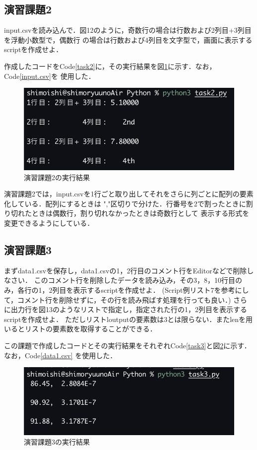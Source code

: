 \documentclass[a4paper,11pt]{jsarticle}
\begin{document}
\subsection{演習課題2}
  \begin{screen}
  input.csvを読み込んで．図12のように，奇数行の場合は行数および2列目+3列目を浮動小数型で，偶数行
  の場合は行数および4列目を文字型で，画面に表示するscriptを作成せよ．
  \end{screen}
  作成したコードをCode\ref{task2}に，その実行結果を図\ref{task2ans}に示す．なお，Code\ref{input.csv}を
  使用した．
  
  \begin{figure}[H]
    \centering
    \includegraphics[width=0.8\linewidth]{Experiment_photo/task2.png}
    \caption{演習課題2の実行結果}
    \label{task2ans}
  \end{figure}
  演習課題2では，input.csvを1行ごと取り出してそれをさらに列ごとに配列の要素化している．配列にするときは
  ","区切りで分けた．行番号を2で割ったときに割り切れたときは偶数行，割り切れなかったときは奇数行として
  表示する形式を変更できるようにしている．

\subsection{演習課題3}
  \begin{screen}
    まずdata1.csvを保存し，data1.csvの1，2行目のコメント行をEditorなどで削除しなさい．
    このコメント行を削除したデータを読み込み，その3，8，10行目のみ，各行の1，2列目を表示するscriptを作成せよ．
    (Script例リスト7を参考にして，コメント行を削除せずに，その行を読み飛ばす処理を行っても良い．)
    さらに出力行を図13のようなリストで指定し，指定された行の1，2列目を表示するscriptを作成せよ．
    ただしリストloutputの要素数は3とは限らない．またlenを用いるとリストの要素数を取得することができる．
  \end{screen}
  この課題で作成したコードとその実行結果をそれぞれCode\ref{task3}と図\ref{task3ans}に示す．なお，Code\ref{data1.csv}
  を使用した．
  
  \begin{figure}[H]
    \centering
    \includegraphics[width=0.8\linewidth]{Experiment_photo/task3.png}
    \caption{演習課題3の実行結果}
    \label{task3ans}
  \end{figure}
\end{document}
